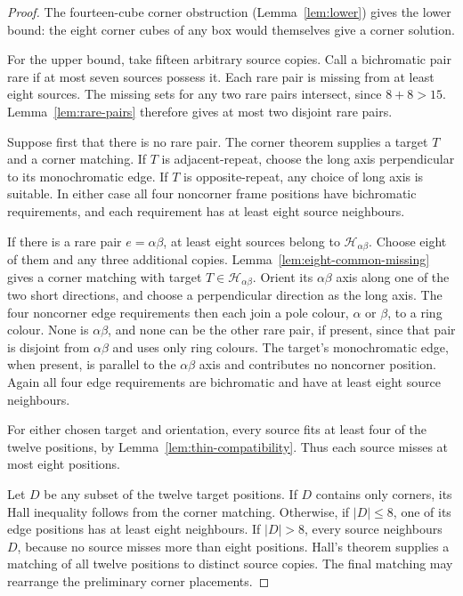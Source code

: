 \begin{proof}
The fourteen-cube corner obstruction (Lemma~\ref{lem:lower}) gives the lower bound: the eight
corner cubes of any box would themselves give a corner solution.

For the upper bound, take fifteen arbitrary source copies. Call a
bichromatic pair rare if at most seven sources possess it. Each rare
pair is missing from at least eight sources. The missing sets for any
two rare pairs intersect, since $8+8>15$. Lemma~\ref{lem:rare-pairs}
therefore gives at most two disjoint rare pairs.

Suppose first that there is no rare pair. The corner theorem supplies
a target $T$ and a corner matching. If $T$ is adjacent-repeat, choose
the long axis perpendicular to its monochromatic edge. If $T$ is
opposite-repeat, any choice of long axis is suitable. In either case
all four noncorner frame positions have bichromatic requirements, and
each requirement has at least eight source neighbours.

If there is a rare pair $e=\alpha\beta$, at least eight sources belong to
$\mathcal H_{\alpha\beta}$. Choose eight of them and any three additional copies.
Lemma~\ref{lem:eight-common-missing} gives a corner matching with target
$T\in\mathcal H_{\alpha\beta}$. Orient its $\alpha\beta$ axis along
one of the two short directions, and choose a perpendicular direction
as the long axis. The four noncorner edge requirements then each join
a pole colour, $\alpha$ or $\beta$, to a ring colour. None is $\alpha\beta$, and none can
be the other rare pair, if present, since that pair is disjoint from
$\alpha\beta$ and uses only ring colours. The target's monochromatic edge,
when present, is parallel to the $\alpha\beta$ axis and contributes no noncorner
position. Again all four edge requirements are bichromatic and have
at least eight source neighbours.

For either chosen target and orientation, every source fits at least
four of the twelve positions, by Lemma~\ref{lem:thin-compatibility}.
Thus each source misses at most eight positions.

Let $D$ be any subset of the twelve target positions. If $D$ contains
only corners, its Hall inequality follows from the corner matching.
Otherwise, if $|D|\le8$, one of its edge positions has at least eight
neighbours. If $|D|>8$, every source neighbours $D$, because no source
misses more than eight positions. Hall's theorem supplies a matching
of all twelve positions to distinct source copies. The final matching
may rearrange the preliminary corner placements.
\end{proof}

